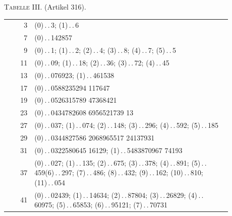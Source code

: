 

\begin{center}\textsc{Tabelle III.} (Artikel 316).\end{center}
\begingroup\small\setlength{\tabcolsep}{5pt}\renewcommand{\arraystretch}{1.0}\setlength{\LTpre}{0pt}
\begin{longtable}{r||>{\raggedright\arraybackslash}p{0.88\linewidth}}\hline
3 & \mbox{(0)\,.\,.\,}\mbox{3}; \mbox{(1)\,.\,.\,}\mbox{6}\\
7 & \mbox{(0)\,.\,.\,}\mbox{142857}\\
9 & \mbox{(0)\,.\,.\,}\mbox{1}; \mbox{(1)\,.\,.\,}\mbox{2}; \mbox{(2)\,.\,.\,}\mbox{4}; \mbox{(3)\,.\,.\,}\mbox{8}; \mbox{(4)\,.\,.\,}\mbox{7}; \mbox{(5)\,.\,.\,}\mbox{5}\\
11 & \mbox{(0)\,.\,.\,}\mbox{09}; \mbox{(1)\,.\,.\,}\mbox{18}; \mbox{(2)\,.\,.\,}\mbox{36}; \mbox{(3)\,.\,.\,}\mbox{72}; \mbox{(4)\,.\,.\,}\mbox{45}\\
13 & \mbox{(0)\,.\,.\,}\mbox{076923}; \mbox{(1)\,.\,.\,}\mbox{461538}\\
17 & \mbox{(0)\,.\,.\,}\mbox{0588235294} \mbox{117647}\\
19 & \mbox{(0)\,.\,.\,}\mbox{0526315789} \mbox{47368421}\\
23 & \mbox{(0)\,.\,.\,}\mbox{0434782608} \mbox{6956521739} \mbox{13}\\
27 & \mbox{(0)\,.\,.\,}\mbox{037}; \mbox{(1)\,.\,.\,}\mbox{074}; \mbox{(2)\,.\,.\,}\mbox{148}; \mbox{(3)\,.\,.\,}\mbox{296}; \mbox{(4)\,.\,.\,}\mbox{592}; \mbox{(5)\,.\,.\,}\mbox{185}\\
29 & \mbox{(0)\,.\,.\,}\mbox{0344827586} \mbox{2068965517} \mbox{24137931}\\
31 & \mbox{(0)\,.\,.\,}\mbox{0322580645} \mbox{16129}; \mbox{(1)\,.\,.\,}\mbox{5483870967} \mbox{74193}\\
37 & \mbox{(0)\,.\,.\,}\mbox{027}; \mbox{(1)\,.\,.\,}\mbox{135}; \mbox{(2)\,.\,.\,}\mbox{675}; \mbox{(3)\,.\,.\,}\mbox{378}; \mbox{(4)\,.\,.\,}\mbox{891}; \mbox{(5)\,.\,.\,}\mbox{459}\newline \mbox{(6)\,.\,.\,}\mbox{297}; \mbox{(7)\,.\,.\,}\mbox{486}; \mbox{(8)\,.\,.\,}\mbox{432}; \mbox{(9)\,.\,.\,}\mbox{162}; \mbox{(10)\,.\,.\,}\mbox{810}; \mbox{(11)\,.\,.\,}\mbox{054}\\
41 & \mbox{(0)\,.\,.\,}\mbox{02439}; \mbox{(1)\,.\,.\,}\mbox{14634}; \mbox{(2)\,.\,.\,}\mbox{87804}; \mbox{(3)\,.\,.\,}\mbox{26829}; \mbox{(4)\,.\,.\,}\mbox{60975}; \mbox{(5)\,.\,.\,}\mbox{65853}; \mbox{(6)\,.\,.\,}\mbox{95121}; \mbox{(7)\,.\,.\,}\mbox{70731}\\

\end{longtable}
